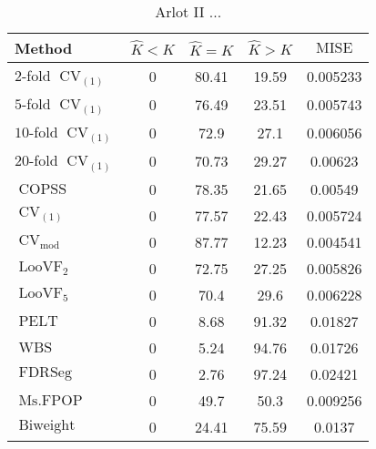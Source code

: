 \begin{table}[ht]
\centering
\begin{tabular}{|l|cccc|}
  \hline
Method & $\hat{K} < K$ & $\hat{K} = K$ & $\hat{K} > K$ & $\operatorname{MISE}$ \\ 
  \hline
$2$-fold $\operatorname{CV}_{(1)}$ &     0 & 80.41 & 19.59 & 0.005233 \\ 
  $5$-fold $\operatorname{CV}_{(1)}$ &     0 & 76.49 & 23.51 & 0.005743 \\ 
  $10$-fold $\operatorname{CV}_{(1)}$ &     0 &  72.9 &  27.1 & 0.006056 \\ 
  $20$-fold $\operatorname{CV}_{(1)}$ &     0 & 70.73 & 29.27 & 0.00623 \\ 
  $\operatorname{COPSS}$ &     0 & 78.35 & 21.65 & 0.00549 \\ 
  $\operatorname{CV}_{(1)}$ &     0 & 77.57 & 22.43 & 0.005724 \\ 
  $\operatorname{CV}_{\operatorname{mod}}$ &     0 & 87.77 & 12.23 & 0.004541 \\ 
  $\operatorname{LooVF}_2$ &     0 & 72.75 & 27.25 & 0.005826 \\ 
  $\operatorname{LooVF}_5$ &     0 &  70.4 &  29.6 & 0.006228 \\ 
  $\operatorname{PELT}$ &     0 &  8.68 & 91.32 & 0.01827 \\ 
  $\operatorname{WBS}$ &     0 &  5.24 & 94.76 & 0.01726 \\ 
  $\operatorname{FDRSeg}$ &     0 &  2.76 & 97.24 & 0.02421 \\ 
  $\operatorname{Ms.FPOP}$ &     0 &  49.7 &  50.3 & 0.009256 \\ 
  $\operatorname{Biweight}$ &     0 & 24.41 & 75.59 & 0.0137 \\ 
   \hline
\end{tabular}
\caption{Arlot II ...} 
\end{table}
